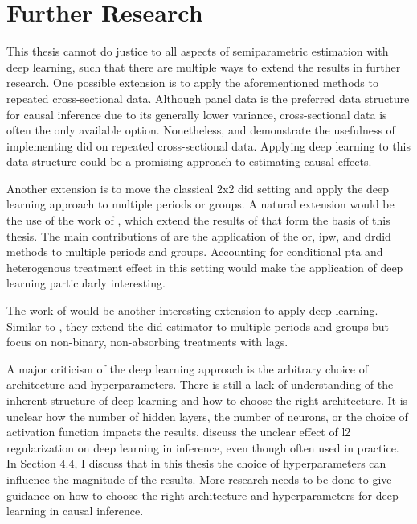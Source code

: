 \section{Further Research}


This thesis cannot do justice to all aspects of semiparametric estimation with deep learning, such that there are multiple ways to extend the results in further research.
One possible extension is to apply the aforementioned methods to repeated cross-sectional data.
Although panel data is the preferred data structure for causal inference due to its generally lower variance, cross-sectional data is often the only available option.
Nonetheless, \citet{santannaDoublyRobustDifferenceindifferences2020} and \citet{manfeDifferenceInDifferenceDesignRepeated} demonstrate the usefulness of implementing \ac{did} on repeated cross-sectional data.
Applying deep learning to this data structure could be a promising approach to estimating causal effects.

Another extension is to move the classical 2x2 \ac{did} setting and apply the deep learning approach to multiple periods or groups.
A natural extension would be the use of the work of \citet{callawayDifferenceinDifferencesMultipleTime2021}, which extend the results of \citet{santannaDoublyRobustDifferenceindifferences2020} that form the basis of this thesis.
The main contributions of  \citet{callawayDifferenceinDifferencesMultipleTime2021} are the application of the \ac{or}, \ac{ipw}, and \ac{drdid} methods to multiple periods and groups.
Accounting for conditional \ac{pta} and heterogenous treatment effect in this setting would make the application of deep learning particularly interesting.

The work of \citet{dechaisemartinDifferenceinDifferencesEstimatorsIntertemporal2024} would be another interesting extension to apply deep learning.
Similar to \citet{callawayDifferenceinDifferencesMultipleTime2021}, they extend the \ac{did} estimator to multiple periods and groups but focus on non-binary, non-absorbing treatments with lags.

A major criticism of the deep learning approach is the arbitrary choice of architecture and hyperparameters.
There is still a lack of understanding of the inherent structure of deep learning and how to choose the right architecture.
It is unclear how the number of hidden layers, the number of neurons, or the choice of activation function impacts the results.
\citet{farrellDeepNeuralNetworks2021} discuss the unclear effect of l2 regularization on deep learning in inference, even though often used in practice.
In Section 4.4, I discuss that in this thesis the choice of hyperparameters can influence the magnitude of the results.
More research needs to be done to give guidance on how to choose the right architecture and hyperparameters for deep learning in causal inference.

